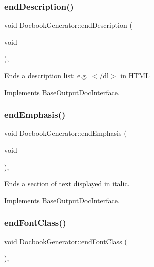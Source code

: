 \subsubsection{\texorpdfstring{endDescription()}{endDescription()}}
{\footnotesize\ttfamily void Docbook\+Generator\+::end\+Description (\begin{DoxyParamCaption}\item[{void}]{ }\end{DoxyParamCaption})\hspace{0.3cm}{\ttfamily [inline]}, {\ttfamily [virtual]}}

Ends a description list\+: e.\+g. {\ttfamily $<$/dl$>$} in H\+T\+ML 

Implements \mbox{\hyperlink{class_base_output_doc_interface_ac25c565e9fd8aee6c2b0d9b71fcff380}{Base\+Output\+Doc\+Interface}}.

\mbox{\label{class_docbook_generator_afa388cf9fb6c58601670f40fec5a2eb7}} 
\subsubsection{\texorpdfstring{endEmphasis()}{endEmphasis()}}
{\footnotesize\ttfamily void Docbook\+Generator\+::end\+Emphasis (\begin{DoxyParamCaption}\item[{void}]{ }\end{DoxyParamCaption})\hspace{0.3cm}{\ttfamily [inline]}, {\ttfamily [virtual]}}

Ends a section of text displayed in italic. 

Implements \mbox{\hyperlink{class_base_output_doc_interface_aed2cf04d82648509f97403bd4ce62590}{Base\+Output\+Doc\+Interface}}.

\mbox{\label{class_docbook_generator_a857d641f5f3894a4053037e842d45a10}} 
\subsubsection{\texorpdfstring{endFontClass()}{endFontClass()}}
{\footnotesize\ttfamily void Docbook\+Generator\+::end\+Font\+Class (\begin{DoxyParamCaption}{ }\end{DoxyParamCaption})\hspace{0.3cm}{\ttfamily [inline]}, {\ttfamily [virtual]}}


